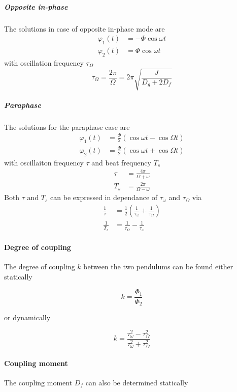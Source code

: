 \documentclass{scrreprt}
\renewcommand{\phi}{\varphi}
\begin{document}
\subparagraph*{Opposite in-phase}
The solutions in case of opposite in-phase mode are
\begin{align}
\phi_1(t) &= -\Phi \cos{\omega t}\\
\phi_2(t) &= \Phi \cos{\omega t}
\end{align}
with oscillation frequency $\tau_{\Omega}$
\begin{equation}
\tau_{\Omega} = \frac{2 \pi}{\Omega} = 2 \pi \sqrt{\frac{J}{D_g+2 D_f}}
\end{equation}

\subparagraph*{Paraphase}
The solutions for the paraphase case are
\begin{align}
\phi_1(t) &= \frac{\Phi}{2}\left(\cos{\omega t} - \cos{\Omega t}\right)\\
\phi_2(t) &= \frac{\Phi}{2}\left(\cos{\omega t} + \cos{\Omega t}\right)
\end{align}
with oscillaiton frequency $\tau$ and beat frequency $T_s$
\begin{align}
\tau &= \frac{4 \pi}{\Omega + \omega}\\
T_s &= \frac{2 \pi}{\Omega -\omega}
\end{align}
Both $\tau$ and $T_s$ can be expressed in dependance of $\tau_{\omega}$ and $\tau_{\Omega}$ via
\begin{align}
\frac{1}{\tau} &= \frac{1}{2}\left( \frac{1}{\tau_{\omega}} + \frac{1}{\tau_{\Omega}} \right)\\
\frac{1}{T_s} &= \frac{1}{\tau_{\Omega}} - \frac{1}{\tau_{\omega}}
\end{align}

\paragraph*{Degree of coupling}
The degree of coupling $k$ between the two pendulums can be found either statically

\begin{equation} \label{eq:coupconst_stat}
k = \frac{\Phi_1}{\Phi_2}
\end{equation}

or dynamically

\begin{equation} \label{eq:coupconst_dyn}
k = \frac{\tau_{\omega}^2 - \tau_{\Omega}^2}{\tau_{\omega}^2 + \tau_{\Omega}^2}
\end{equation}

\paragraph*{Coupling moment}
The coupling moment $D_f$ can also be determined statically
\end{document}
